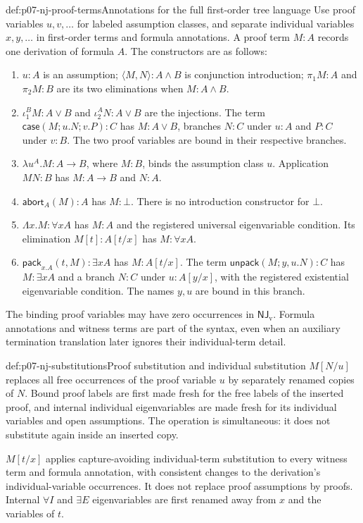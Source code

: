 \begin{hbdefinition}{def:p07-nj-proof-terms}{Annotations for the full first-order tree language}
Use proof variables \(u,v,\ldots\) for labeled assumption classes,
and separate individual variables \(x,y,\ldots\) in first-order
terms and formula annotations. A proof term \(M:A\) records
one derivation of formula \(A\). The constructors are as follows:
\begin{enumerate}
\item \(u:A\) is an assumption; \(\langle M,N\rangle:A\land B\)
is conjunction introduction; \(\pi_1M:A\) and \(\pi_2M:B\)
are its two eliminations when \(M:A\land B\).
\item \(\iota_1^B M:A\lor B\) and \(\iota_2^A N:A\lor B\)
are the injections. The term
\(\mathsf{case}(M;u.N;v.P):C\) has \(M:A\lor B\),
branches \(N:C\) under \(u:A\) and \(P:C\) under \(v:B\).
The two proof variables are bound in their respective branches.
\item \(\lambda u^A.M:A\to B\), where \(M:B\), binds
the assumption class \(u\). Application \(MN:B\) has
\(M:A\to B\) and \(N:A\).
\item \(\mathsf{abort}_A(M):A\) has \(M:\bot\).
There is no introduction constructor for \(\bot\).
\item \(\Lambda x.M:\forall x A\) has \(M:A\) and
the registered universal eigenvariable condition. Its elimination
\(M[t]:A[t/x]\) has \(M:\forall x A\).
\item \(\mathsf{pack}_{x.A}(t,M):\exists x A\) has
\(M:A[t/x]\). The term
\(\mathsf{unpack}(M;y,u.N):C\) has \(M:\exists x A\)
and a branch \(N:C\) under \(u:A[y/x]\), with the registered
existential eigenvariable condition. The names \(y,u\) are
bound in this branch.
\end{enumerate}
The binding proof variables may have zero occurrences in
\(\mathsf{NJ}_{\mathrm v}\). Formula annotations and witness
terms are part of the syntax, even when an auxiliary termination
translation later ignores their individual-term detail.
\end{hbdefinition}

\begin{hbdefinition}{def:p07-nj-substitutions}{Proof substitution and individual substitution}
\(M[N/u]\) replaces all free occurrences of the proof variable
\(u\) by separately renamed copies of \(N\). Bound proof labels
are first made fresh for the free labels of the inserted proof,
and internal individual eigenvariables are made fresh for its
individual variables and open assumptions. The operation is
simultaneous: it does not substitute again inside an inserted copy.

\(M[t/x]\) applies capture-avoiding individual-term substitution
to every witness term and formula annotation, with consistent
changes to the derivation's individual-variable occurrences.
It does not replace proof assumptions by proofs. Internal
\(\forall I\) and \(\exists E\) eigenvariables are first
renamed away from \(x\) and the variables of \(t\).
\end{hbdefinition}

